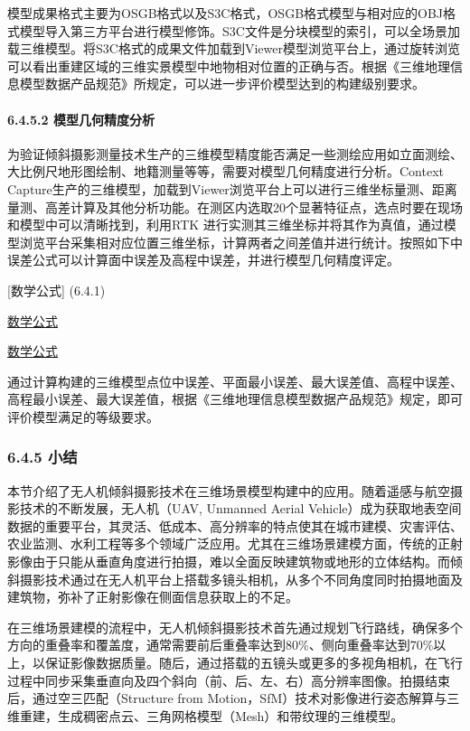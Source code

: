模型成果格式主要为OSGB格式以及S3C格式，OSGB格式模型与相对应的OBJ格式模型导入第三方平台进行模型修饰。S3C文件是分块模型的索引，可以全场景加载三维模型。将S3C格式的成果文件加载到Viewer模型浏览平台上，通过旋转浏览可以看出重建区域的三维实景模型中地物相对位置的正确与否。根据《三维地理信息模型数据产品规范》所规定，可以进一步评价模型达到的构建级别要求。

\paragraph{6.4.5.2 模型几何精度分析}\label{ux6a21ux578bux51e0ux4f55ux7cbeux5ea6ux5206ux6790}

为验证倾斜摄影测量技术生产的三维模型精度能否满足一些测绘应用如立面测绘、大比例尺地形图绘制、地籍测量等等，需要对模型几何精度进行分析。Context Capture生产的三维模型，加载到Viewer浏览平台上可以进行三维坐标量测、距离量测、高差计算及其他分析功能。在测区内选取20个显著特征点，选点时要在现场和模型中可以清晰找到，利用RTK 进行实测其三维坐标并将其作为真值，通过模型浏览平台采集相对应位置三维坐标，计算两者之间差值并进行统计。按照如下中误差公式可以计算面中误差及高程中误差，并进行模型几何精度评定。

{[}数学公式{]} (6.4.1)

\href{6.4.2}{数学公式}

\href{6.4.3}{数学公式}

通过计算构建的三维模型点位中误差、平面最小误差、最大误差值、高程中误差、高程最小误差、最大误差值，根据《三维地理信息模型数据产品规范》规定，即可评价模型满足的等级要求。

\subsubsection{6.4.5 小结}\label{ux5c0fux7ed3-3}

本节介绍了无人机倾斜摄影技术在三维场景模型构建中的应用。随着遥感与航空摄影技术的不断发展，无人机（UAV, Unmanned Aerial Vehicle）成为获取地表空间数据的重要平台，其灵活、低成本、高分辨率的特点使其在城市建模、灾害评估、农业监测、水利工程等多个领域广泛应用。尤其在三维场景建模方面，传统的正射影像由于只能从垂直角度进行拍摄，难以全面反映建筑物或地形的立体结构。而倾斜摄影技术通过在无人机平台上搭载多镜头相机，从多个不同角度同时拍摄地面及建筑物，弥补了正射影像在侧面信息获取上的不足。

在三维场景建模的流程中，无人机倾斜摄影技术首先通过规划飞行路线，确保多个方向的重叠率和覆盖度，通常需要前后重叠率达到80\%、侧向重叠率达到70\%以上，以保证影像数据质量。随后，通过搭载的五镜头或更多的多视角相机，在飞行过程中同步采集垂直向及四个斜向（前、后、左、右）高分辨率图像。拍摄结束后，通过空三匹配（Structure from Motion，SfM）技术对影像进行姿态解算与三维重建，生成稠密点云、三角网格模型（Mesh）和带纹理的三维模型。

